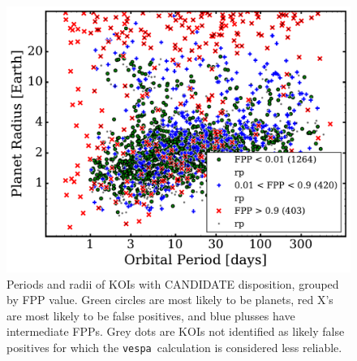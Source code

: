 \documentclass{emulateapj}
\newcommand{\figlabel}[1]{\label{fig:#1}}
\newcommand{\vespa}{\texttt{vespa}}
\begin{document}
\begin{figure}[p]
\begin{center}
\includegraphics[width=7in]{figures/RP_cand.pdf}
\end{center}
\caption{Periods and radii of KOIs with CANDIDATE disposition, grouped
  by FPP value.  Green circles are most likely to be planets, red X's
  are most likely to be false positives, and blue plusses have
  intermediate FPPs.  Grey dots are KOIs not identified as likely 
  false positives for which the
  \vespa\ calculation is considered less reliable.  
  \figlabel{rpcand}}
\end{figure}





\begin{turnpage}

\end{turnpage}
\end{document}
